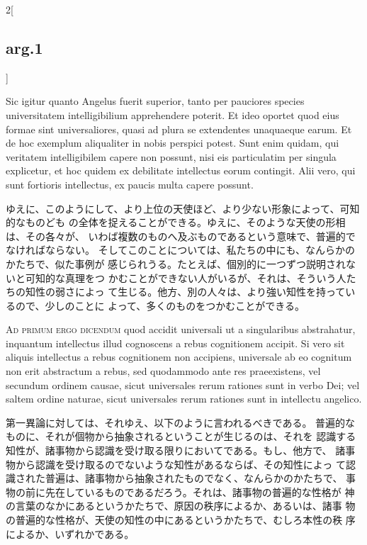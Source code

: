 \documentclass[paper=a4paper,fontsize=10pt,jafontsize=9pt,titlepage]{jlreq}
\begin{document}
\begin{paracol}{2}[\subsection{arg.1}]
\switchcolumn*

Sic
igitur quanto Angelus fuerit superior, tanto per pauciores species
universitatem intelligibilium apprehendere poterit. Et ideo oportet quod
eius formae sint universaliores, quasi ad plura se extendentes
unaquaeque earum. Et de hoc exemplum aliqualiter in nobis perspici
potest. Sunt enim quidam, qui veritatem intelligibilem capere non
possunt, nisi eis particulatim per singula explicetur, et hoc quidem ex
debilitate intellectus eorum contingit. Alii vero, qui sunt fortioris
intellectus, ex paucis multa capere possunt.

\switchcolumn

ゆえに、このようにして、より上位の天使ほど、より少ない形象によって、可知的なものども
 の全体を捉えることができる。ゆえに、そのような天使の形相は、その各々が、
 いわば複数のものへ及ぶものであるという意味で、普遍的でなければならない。
そしてこのことについては、私たちの中にも、なんらかのかたちで、似た事例が
 感じられうる。たとえば、個別的に一つずつ説明されないと可知的な真理をつ
 かむことができない人がいるが、それは、そういう人たちの知性の弱さによっ
 て生じる。他方、別の人々は、より強い知性を持っているので、少しのことに
 よって、多くのものをつかむことができる。

\switchcolumn*[\subsection{ad.1}]

{\scshape Ad primum ergo dicendum} quod accidit
universali ut a singularibus abstrahatur, inquantum intellectus illud
cognoscens a rebus cognitionem accipit. Si vero sit aliquis intellectus
a rebus cognitionem non accipiens, universale ab eo cognitum non erit
abstractum a rebus, sed quodammodo ante res praeexistens, vel secundum
ordinem causae, sicut universales rerum rationes sunt in verbo Dei; vel
saltem ordine naturae, sicut universales rerum rationes sunt in
intellectu angelico.

\switchcolumn

第一異論に対しては、それゆえ、以下のように言われるべきである。
 普遍的なものに、それが個物から抽象されるということが生じるのは、それを
認識する知性が、諸事物から認識を受け取る限りにおいてである。もし、他方で、
 諸事物から認識を受け取るのでないような知性があるならば、その知性によっ
 て認識された普遍は、諸事物から抽象されたものでなく、なんらかのかたちで、
 事物の前に先在しているものであるだろう。それは、諸事物の普遍的な性格が
 神の言葉のなかにあるというかたちで、原因の秩序によるか、あるいは、諸事
 物の普遍的な性格が、天使の知性の中にあるというかたちで、むしろ本性の秩
 序によるか、いずれかである。


\end{paracol}
\end{document}
